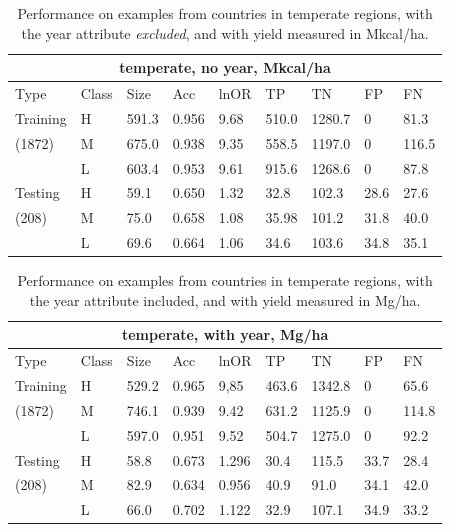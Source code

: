 \documentclass[12pt]{article}
\begin{document}
\begin{table}[h!]
\centering
\begin{tabular}{lllllllll}
\toprule
\multicolumn{9}{c}{\textbf{temperate, no year, Mkcal/ha}} \\
\midrule
Type & Class & Size & Acc & lnOR & TP & TN & FP & FN \\
\midrule
Training & H & 591.3 & 0.956 & 9.68 & 510.0 & 1280.7 & 0 & 81.3  \\
(1872) & M & 675.0 & 0.938 & 9.35 & 558.5 & 1197.0 & 0 & 116.5  \\
& L & 603.4 & 0.953 & 9.61 & 915.6 & 1268.6 & 0 & 87.8  \\
Testing & H & 59.1 & 0.650 & 1.32 & 32.8 & 102.3 & 28.6 & 27.6  \\
(208) & M & 75.0 & 0.658 & 1.08 & 35.98 & 101.2 & 31.8 & 40.0  \\
& L & 69.6 & 0.664 & 1.06 & 34.6 & 103.6 & 34.8 & 35.1  \\
\bottomrule
\end{tabular}
\caption{Performance on examples from countries in temperate regions, with the year attribute \emph{excluded}, and with yield measured in Mkcal/ha.}
\label{k.ny.temp_results}
\end{table}

\begin{table}[h!]
\centering
\begin{tabular}{lllllllll}
\toprule
\multicolumn{9}{c}{\textbf{temperate, with year, Mg/ha}} \\
\midrule
Type & Class & Size & Acc & lnOR & TP & TN & FP & FN \\
\midrule
Training & H & 529.2 & 0.965 & 9,85 & 463.6 & 1342.8 & 0 & 65.6  \\
(1872) & M & 746.1 & 0.939 & 9.42 & 631.2 & 1125.9 & 0 & 114.8  \\
& L & 597.0 & 0.951 & 9.52 & 504.7 & 1275.0 & 0 & 92.2  \\
Testing & H & 58.8 & 0.673 & 1.296 & 30.4 & 115.5 & 33.7 & 28.4  \\
(208) & M & 82.9 & 0.634 & 0.956 & 40.9 & 91.0 & 34.1 & 42.0  \\
& L & 66.0 & 0.702 & 1.122 & 32.9 & 107.1 & 34.9 & 33.2  \\
\bottomrule
\end{tabular}
\caption{Performance on examples from countries in temperate regions, with the year attribute included, and with yield measured in Mg/ha.}
\label{t.wy.temp_results}
\end{table}
\end{document}
